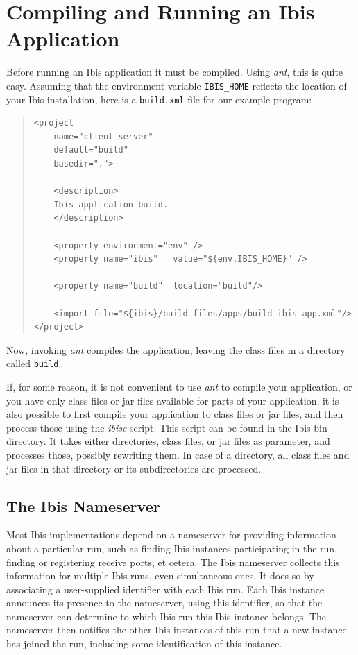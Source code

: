 \documentclass[10pt]{article}
\newcommand{\mysection}[1]{\section{#1}\label{#1}}
\newcommand{\mysubsection}[1]{\subsection{#1}\label{#1}}
\begin{document}
\mysection{Compiling and Running an Ibis Application}

Before running an Ibis application it must be compiled.  Using
\emph{ant}, this is quite easy. Assuming that the environment variable
\texttt{IBIS\_HOME} reflects the location of your Ibis installation,
here is a \texttt{build.xml} file
for our example program:

{\small
\begin{quote}
\begin{verbatim}
<project
    name="client-server"
    default="build"
    basedir=".">

    <description>
    Ibis application build.
    </description>

    <property environment="env" />
    <property name="ibis"   value="${env.IBIS_HOME}" />

    <property name="build"  location="build"/>

    <import file="${ibis}/build-files/apps/build-ibis-app.xml"/>
</project>
\end{verbatim}
\end{quote}
}

Now, invoking \emph{ant} compiles the application, leaving the class files
in a directory called \texttt{build}.

If, for some reason, it is not convenient to use \emph{ant} to compile
your application, or you have only class files or jar files available
for parts of your application, it is also possible to first compile
your application to class files or jar files, and then process those
using the \emph{ibisc} script. This script can be found in the Ibis
bin directory. It takes either directories, class files, or jar files
as parameter, and processes those, possibly rewriting them. In case
of a directory, all class files and jar files in that directory or
its subdirectories are processed.

\mysubsection{The Ibis Nameserver}

Most Ibis implementations depend on a nameserver for providing
information about a particular run, such as finding Ibis instances
participating in the run, finding or registering receive ports, et cetera.
The Ibis nameserver collects this information for multiple Ibis
runs, even simultaneous ones. It does so by associating a user-supplied
identifier with each Ibis run. Each Ibis instance announces its
presence to the nameserver, using this identifier, so that the
nameserver can determine to which Ibis run this Ibis instance belongs.
The nameserver then notifies the other Ibis instances of this run that
a new instance has joined the run, including some identification of
this instance.
\end{document}

